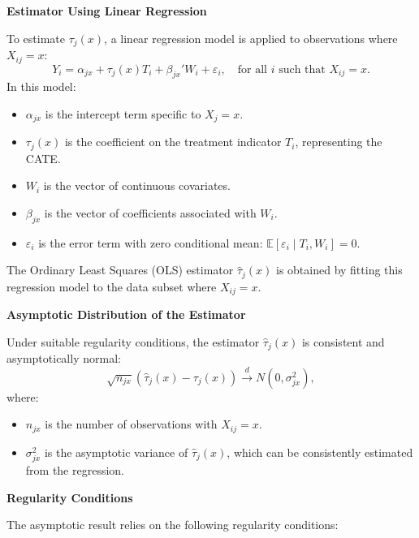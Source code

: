 \documentclass{article}
\begin{document}
\textbf{Estimator Using Linear Regression}

To estimate \( \tau_j(x) \), a linear regression model is applied to observations where \( X_{ij} = x \):
\[
Y_i = \alpha_{jx} + \tau_j(x) T_i + \beta_{jx}' W_i + \varepsilon_i, \quad \text{for all } i \text{ such that } X_{ij} = x.
\]
In this model:
\begin{itemize}
    \item \( \alpha_{jx} \) is the intercept term specific to \( X_j = x \).
    \item \( \tau_j(x) \) is the coefficient on the treatment indicator \( T_i \), representing the CATE.
    \item \( W_i \) is the vector of continuous covariates.
    \item \( \beta_{jx} \) is the vector of coefficients associated with \( W_i \).
    \item \( \varepsilon_i \) is the error term with zero conditional mean: \( \mathbb{E}[ \varepsilon_i \mid T_i, W_i ] = 0 \).
\end{itemize}
The Ordinary Least Squares (OLS) estimator \( \hat{\tau}_j(x) \) is obtained by fitting this regression model to the data subset where \( X_{ij} = x \).

\textbf{Asymptotic Distribution of the Estimator}

Under suitable regularity conditions, the estimator \( \hat{\tau}_j(x) \) is consistent and asymptotically normal:
\[
\sqrt{n_{jx}} \left( \hat{\tau}_j(x) - \tau_j(x) \right) \xrightarrow{d} N\left( 0, \sigma^2_{jx} \right),
\]
where:
\begin{itemize}
    \item \( n_{jx} \) is the number of observations with \( X_{ij} = x \).
    \item \( \sigma^2_{jx} \) is the asymptotic variance of \( \hat{\tau}_j(x) \), which can be consistently estimated from the regression.
\end{itemize}

\textbf{Regularity Conditions}

The asymptotic result relies on the following regularity conditions:
\end{document}
